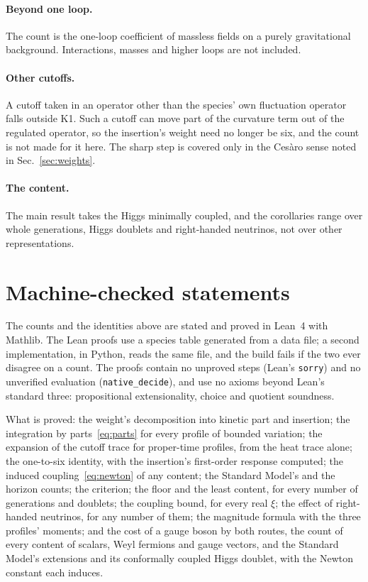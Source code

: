 \documentclass[aps,prd,reprint,amsmath,amssymb,superscriptaddress,nofootinbib]{revtex4-2}
\begin{document}
\paragraph{Beyond one loop.} The count is the one-loop coefficient of massless fields
on a purely gravitational background. Interactions, masses and higher loops are not
included.

\paragraph{Other cutoffs.} A cutoff taken in an operator other than the species'
own fluctuation operator falls outside K1. Such a cutoff can move part of the
curvature term out of the regulated operator, so the insertion's weight need no
longer be six, and the count is not made for it here. The sharp step is covered
only in the Ces\`aro sense noted in Sec.~\ref{sec:weights}.

\paragraph{The content.} The main result takes the Higgs minimally coupled, and the
corollaries range over whole generations, Higgs doublets and right-handed neutrinos,
not over other representations.

\section{Machine-checked statements}
\label{sec:lean}

The counts and the identities above are stated and proved in Lean~4 with Mathlib.
The Lean proofs use a species table generated from a data file; a second
implementation, in Python, reads the same file, and the build fails if the two ever
disagree on a count. The proofs contain no unproved steps (Lean's \texttt{sorry}) and
no unverified evaluation (\texttt{native\_decide}), and use no axioms beyond Lean's
standard three: propositional extensionality, choice and quotient soundness.

What is proved: the weight's decomposition into kinetic part and insertion; the
integration by parts~\eqref{eq:parts} for every profile of bounded variation; the
expansion of the cutoff trace for proper-time profiles, from the heat trace alone;
the one-to-six identity, with the insertion's first-order response computed; the
induced coupling~\eqref{eq:newton} of any content; the Standard Model's and the
horizon counts; the criterion; the floor and the least content, for every number of
generations and doublets; the coupling bound, for every real $\xi$; the effect of
right-handed neutrinos, for any number of them; the magnitude formula with the three
profiles' moments; and the cost of a gauge boson by both routes, the count of every
content of scalars, Weyl fermions and gauge vectors, and the Standard Model's
extensions and its conformally coupled Higgs doublet, with the Newton constant each
induces.
\end{document}
